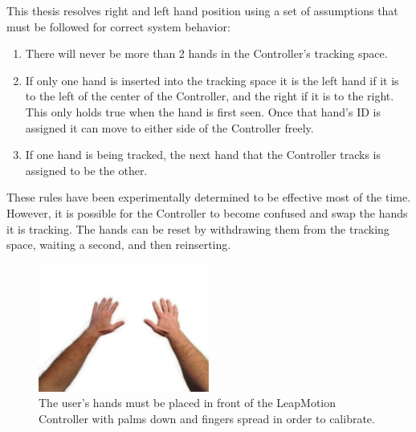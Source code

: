 This thesis resolves right and left hand position using a set of assumptions that must be followed for correct system behavior:

\begin{enumerate}
	\item There will never be more than 2 hands in the Controller's tracking space.
	\item If only one hand is inserted into the tracking space it is the left hand if it is to the left of the center of the Controller, and the right if it is to the right. This only holds true when the hand is first seen. Once that hand's ID is assigned it can move to either side of the Controller freely.
	\item If one hand is being tracked, the next hand that the Controller tracks is assigned to be the other.
\end{enumerate}

These rules have been experimentally determined to be effective most of the time. However, it is possible for the Controller to become confused and swap the hands it is tracking. The hands can be reset by withdrawing them from the tracking space, waiting a second, and then reinserting.

\begin{figure}[]
\centering
\includegraphics[width=0.5\textwidth]{figures/handsStraight}
\caption{The user's hands must be placed in front of the LeapMotion Controller with palms down and fingers spread in order to calibrate.}
\label{fig:hand_default}
\end{figure}

